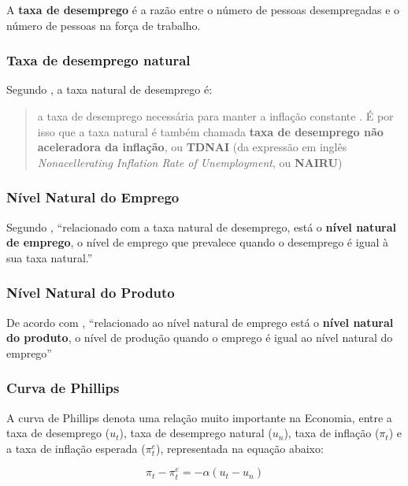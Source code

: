 \documentclass[]{article}
\begin{document}
A \textbf{taxa de desemprego} é a razão entre o número de pessoas
desempregadas e o número de pessoas na força de trabalho.

\subsubsection{Taxa de desemprego
natural}\label{taxa-de-desemprego-natural}

Segundo \cite[p.~156]{blanchard}, a taxa natural de desemprego é:

\begin{quote}
a taxa de desemprego necessária para manter a inflação constante . É por
isso que a taxa natural é também chamada \textbf{taxa de desemprego não
aceleradora da inflação}, ou \textbf{TDNAI} (da expressão em inglês
\emph{Nonacellerating Inflation Rate of Unemployment}, ou
\textbf{NAIRU})
\end{quote}

\subsubsection{Nível Natural do Emprego}\label{nivel-natural-do-emprego}

Segundo \cite[p.~119]{blanchard}, ``relacionado com a taxa natural de
desemprego, está o \textbf{nível natural de emprego}, o nível de emprego
que prevalece quando o desemprego é igual à sua taxa natural.''

\subsubsection{Nível Natural do Produto}\label{nivel-natural-do-produto}

De acordo com \cite[p.~119]{blanchard}, ``relacionado ao nível natural
de emprego está o \textbf{nível natural do produto}, o nível de produção
quando o emprego é igual ao nível natural do emprego''

\subsubsection{Curva de Phillips}\label{curva-de-phillips}

A curva de Phillips denota uma relação muito importante na Economia,
entre a taxa de desemprego (\(u_t\)), taxa de desemprego natural
(\(u_n\)), taxa de inflação (\(\pi_t\)) e a taxa de inflação esperada
(\(\pi_t^e\)), representada na equação abaixo:

\[\pi_t - \pi_t^e = -\alpha (u_t - u_n)\]
\end{document}
